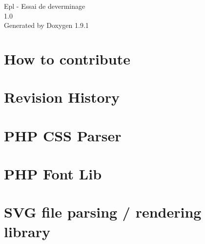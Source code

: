 \let\mypdfximage\pdfximage\def\pdfximage{\immediate\mypdfximage}\documentclass[twoside]{book}
\newcommand{\+}{\discretionary{\mbox{\scriptsize$\hookleftarrow$}}{}{}}
\newcommand{\clearemptydoublepage}{%
  \newpage{\pagestyle{empty}\cleardoublepage}%
}
\begin{document}
\raggedbottom

\hypersetup{pageanchor=false,
             bookmarksnumbered=true,
             pdfencoding=unicode
            }
\begin{titlepage}
\vspace*{7cm}
\begin{center}%
{\Large Epl -\/ Essai de deverminage \\[1ex]\large 1.\+0 }\\
\vspace*{1cm}
{\large Generated by Doxygen 1.9.1}\\
\end{center}
\end{titlepage}
\clearemptydoublepage
{}
\tableofcontents
\clearemptydoublepage
{}
\hypersetup{pageanchor=true}

\chapter{How to contribute}
\label{md_php_dompdf__c_o_n_t_r_i_b_u_t_i_n_g}

\chapter{Revision History}
\label{md_php_dompdf_lib_php_css_parser__c_h_a_n_g_e_l_o_g}

\chapter{PHP CSS Parser}
\label{md_php_dompdf_lib_php_css_parser__r_e_a_d_m_e}

\chapter{PHP Font Lib}
\label{md_php_dompdf_lib_php_font_lib__r_e_a_d_m_e}

\chapter{SVG file parsing / rendering library}
\label{md_php_dompdf_lib_php_svg_lib__r_e_a_d_m_e}

\end{document}
